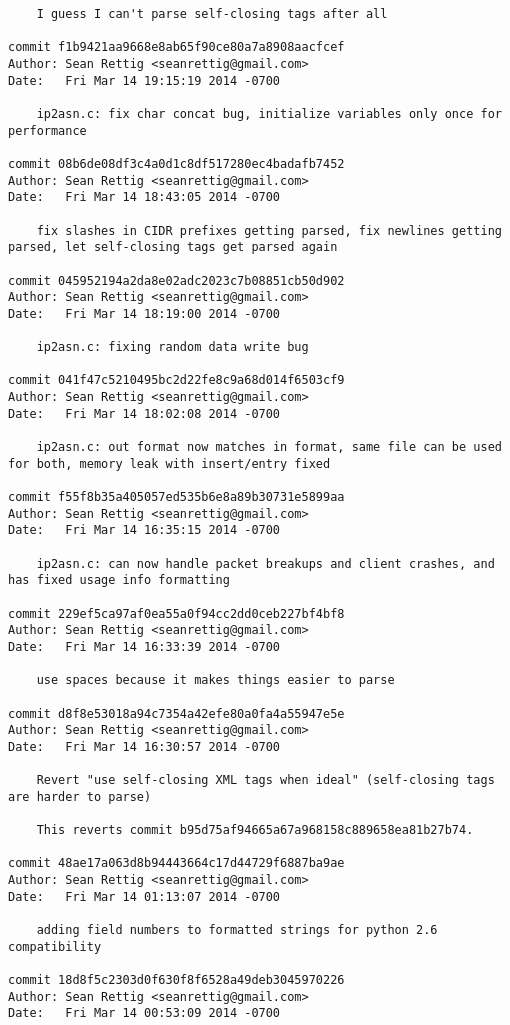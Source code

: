 \documentclass[letterpaper,10pt,fleqn]{article}
\numberwithin{equation}{section}
\begin{document}
\begin{verbatim}
    I guess I can't parse self-closing tags after all

commit f1b9421aa9668e8ab65f90ce80a7a8908aacfcef
Author: Sean Rettig <seanrettig@gmail.com>
Date:   Fri Mar 14 19:15:19 2014 -0700

    ip2asn.c: fix char concat bug, initialize variables only once for performance

commit 08b6de08df3c4a0d1c8df517280ec4badafb7452
Author: Sean Rettig <seanrettig@gmail.com>
Date:   Fri Mar 14 18:43:05 2014 -0700

    fix slashes in CIDR prefixes getting parsed, fix newlines getting parsed, let self-closing tags get parsed again

commit 045952194a2da8e02adc2023c7b08851cb50d902
Author: Sean Rettig <seanrettig@gmail.com>
Date:   Fri Mar 14 18:19:00 2014 -0700

    ip2asn.c: fixing random data write bug

commit 041f47c5210495bc2d22fe8c9a68d014f6503cf9
Author: Sean Rettig <seanrettig@gmail.com>
Date:   Fri Mar 14 18:02:08 2014 -0700

    ip2asn.c: out format now matches in format, same file can be used for both, memory leak with insert/entry fixed

commit f55f8b35a405057ed535b6e8a89b30731e5899aa
Author: Sean Rettig <seanrettig@gmail.com>
Date:   Fri Mar 14 16:35:15 2014 -0700

    ip2asn.c: can now handle packet breakups and client crashes, and has fixed usage info formatting

commit 229ef5ca97af0ea55a0f94cc2dd0ceb227bf4bf8
Author: Sean Rettig <seanrettig@gmail.com>
Date:   Fri Mar 14 16:33:39 2014 -0700

    use spaces because it makes things easier to parse

commit d8f8e53018a94c7354a42efe80a0fa4a55947e5e
Author: Sean Rettig <seanrettig@gmail.com>
Date:   Fri Mar 14 16:30:57 2014 -0700

    Revert "use self-closing XML tags when ideal" (self-closing tags are harder to parse)
    
    This reverts commit b95d75af94665a67a968158c889658ea81b27b74.

commit 48ae17a063d8b94443664c17d44729f6887ba9ae
Author: Sean Rettig <seanrettig@gmail.com>
Date:   Fri Mar 14 01:13:07 2014 -0700

    adding field numbers to formatted strings for python 2.6 compatibility

commit 18d8f5c2303d0f630f8f6528a49deb3045970226
Author: Sean Rettig <seanrettig@gmail.com>
Date:   Fri Mar 14 00:53:09 2014 -0700


\end{verbatim}
\end{document}
